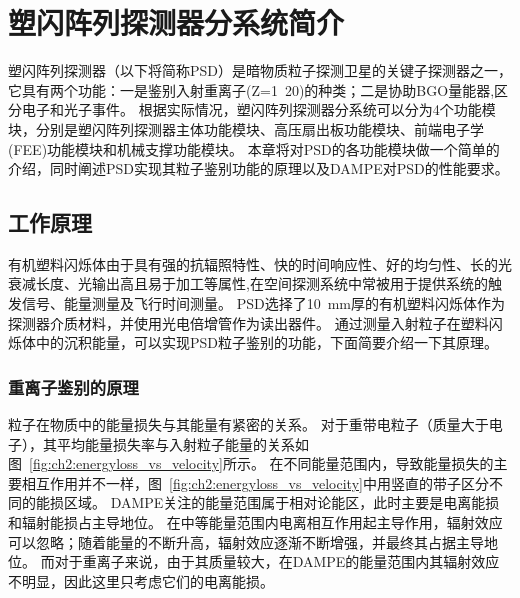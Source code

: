 \chapter{塑闪阵列探测器分系统简介}
塑闪阵列探测器（以下将简称PSD）是暗物质粒子探测卫星的关键子探测器之一，它具有两个功能：一是鉴别入射重离子(Z=1~20)的种类；二是协助BGO量能器,区分电子和光子事件。
根据实际情况，塑闪阵列探测器分系统可以分为4个功能模块，分别是塑闪阵列探测器主体功能模块、高压扇出板功能模块、前端电子学(FEE)功能模块和机械支撑功能模块。
本章将对PSD的各功能模块做一个简单的介绍，同时阐述PSD实现其粒子鉴别功能的原理以及DAMPE对PSD的性能要求。

\section{工作原理}
\label{sec:psd_principle}
有机塑料闪烁体由于具有强的抗辐照特性、快的时间响应性、好的均匀性、长的光衰减长度、光输出高且易于加工等属性,在空间探测系统中常被用于提供系统的触发信号、能量测量及飞行时间测量。
PSD选择了\SI{10}{\milli\meter}厚的有机塑料闪烁体作为探测器介质材料，并使用光电倍增管作为读出器件。
通过测量入射粒子在塑料闪烁体中的沉积能量，可以实现PSD粒子鉴别的功能，下面简要介绍一下其原理。

\subsection{重离子鉴别的原理}
粒子在物质中的能量损失与其能量有紧密的关系。
对于重带电粒子（质量大于电子），其平均能量损失率与入射粒子能量的关系如图~\ref{fig:ch2:energyloss_vs_velocity}所示。
在不同能量范围内，导致能量损失的主要相互作用并不一样，图~\ref{fig:ch2:energyloss_vs_velocity}中用竖直的带子区分不同的能损区域。
DAMPE关注的能量范围属于相对论能区，此时主要是电离能损和辐射能损占主导地位。
在中等能量范围内电离相互作用起主导作用，辐射效应可以忽略；随着能量的不断升高，辐射效应逐渐不断增强，并最终其占据主导地位。
而对于重离子来说，由于其质量较大，在DAMPE的能量范围内其辐射效应不明显，因此这里只考虑它们的电离能损。

